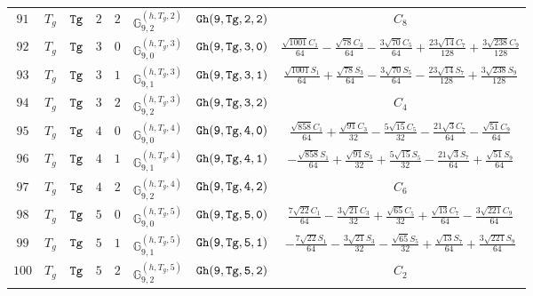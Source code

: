 \documentclass[fleqn,8pt]{jsarticle}
\begin{document}
\begin{table}[ht!]
\begin{center}
\begin{tabular}{cccccccc}
$ 91 $ & $ T_{g} $ & $ {\tt Tg} $ & $ 2 $ & $ 2 $ & $ \mathbb{G}_{9,2}^{(h,T_{g},2)} $ & $ {\tt Gh(9,Tg,2,2)} $ & $ C_{8} $ \\
$ 92 $ & $ T_{g} $ & $ {\tt Tg} $ & $ 3 $ & $ 0 $ & $ \mathbb{G}_{9,0}^{(h,T_{g},3)} $ & $ {\tt Gh(9,Tg,3,0)} $ & $ \frac{\sqrt{1001} C_{1}}{64} - \frac{\sqrt{78} C_{3}}{64} - \frac{3 \sqrt{70} C_{5}}{64} + \frac{23 \sqrt{14} C_{7}}{128} + \frac{3 \sqrt{238} C_{9}}{128} $ \\
$ 93 $ & $ T_{g} $ & $ {\tt Tg} $ & $ 3 $ & $ 1 $ & $ \mathbb{G}_{9,1}^{(h,T_{g},3)} $ & $ {\tt Gh(9,Tg,3,1)} $ & $ \frac{\sqrt{1001} S_{1}}{64} + \frac{\sqrt{78} S_{3}}{64} - \frac{3 \sqrt{70} S_{5}}{64} - \frac{23 \sqrt{14} S_{7}}{128} + \frac{3 \sqrt{238} S_{9}}{128} $ \\
$ 94 $ & $ T_{g} $ & $ {\tt Tg} $ & $ 3 $ & $ 2 $ & $ \mathbb{G}_{9,2}^{(h,T_{g},3)} $ & $ {\tt Gh(9,Tg,3,2)} $ & $ C_{4} $ \\
$ 95 $ & $ T_{g} $ & $ {\tt Tg} $ & $ 4 $ & $ 0 $ & $ \mathbb{G}_{9,0}^{(h,T_{g},4)} $ & $ {\tt Gh(9,Tg,4,0)} $ & $ \frac{\sqrt{858} C_{1}}{64} + \frac{\sqrt{91} C_{3}}{32} - \frac{5 \sqrt{15} C_{5}}{32} - \frac{21 \sqrt{3} C_{7}}{64} - \frac{\sqrt{51} C_{9}}{64} $ \\
$ 96 $ & $ T_{g} $ & $ {\tt Tg} $ & $ 4 $ & $ 1 $ & $ \mathbb{G}_{9,1}^{(h,T_{g},4)} $ & $ {\tt Gh(9,Tg,4,1)} $ & $ - \frac{\sqrt{858} S_{1}}{64} + \frac{\sqrt{91} S_{3}}{32} + \frac{5 \sqrt{15} S_{5}}{32} - \frac{21 \sqrt{3} S_{7}}{64} + \frac{\sqrt{51} S_{9}}{64} $ \\
$ 97 $ & $ T_{g} $ & $ {\tt Tg} $ & $ 4 $ & $ 2 $ & $ \mathbb{G}_{9,2}^{(h,T_{g},4)} $ & $ {\tt Gh(9,Tg,4,2)} $ & $ C_{6} $ \\
$ 98 $ & $ T_{g} $ & $ {\tt Tg} $ & $ 5 $ & $ 0 $ & $ \mathbb{G}_{9,0}^{(h,T_{g},5)} $ & $ {\tt Gh(9,Tg,5,0)} $ & $ \frac{7 \sqrt{22} C_{1}}{64} - \frac{3 \sqrt{21} C_{3}}{32} + \frac{\sqrt{65} C_{5}}{32} + \frac{\sqrt{13} C_{7}}{64} - \frac{3 \sqrt{221} C_{9}}{64} $ \\
$ 99 $ & $ T_{g} $ & $ {\tt Tg} $ & $ 5 $ & $ 1 $ & $ \mathbb{G}_{9,1}^{(h,T_{g},5)} $ & $ {\tt Gh(9,Tg,5,1)} $ & $ - \frac{7 \sqrt{22} S_{1}}{64} - \frac{3 \sqrt{21} S_{3}}{32} - \frac{\sqrt{65} S_{5}}{32} + \frac{\sqrt{13} S_{7}}{64} + \frac{3 \sqrt{221} S_{9}}{64} $ \\
$ 100 $ & $ T_{g} $ & $ {\tt Tg} $ & $ 5 $ & $ 2 $ & $ \mathbb{G}_{9,2}^{(h,T_{g},5)} $ & $ {\tt Gh(9,Tg,5,2)} $ & $ C_{2} $ \\
 \hline \hline
\end{tabular}
\end{center}
\end{table}
\end{document}

